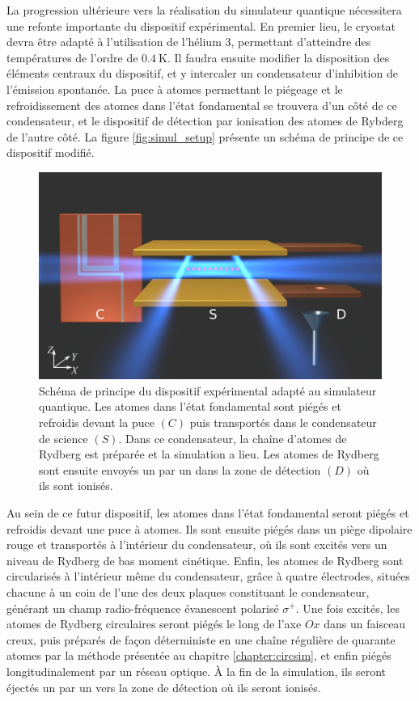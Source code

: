 \bigskip
La progression ultérieure vers la réalisation du simulateur quantique nécessitera une refonte importante du dispositif expérimental.
En premier lieu, le cryostat devra être adapté à l'utilisation de l'hélium $3$, permettant d'atteindre des températures de l'ordre de $\SI{0.4}{\K}$.
Il faudra ensuite modifier la disposition des éléments centraux du dispositif, et y intercaler un condensateur d'inhibition de l'émission spontanée.
La puce à atomes permettant le piégeage et le refroidissement des atomes dans l'état fondamental se trouvera d'un côté de ce condensateur, et le dispositif de détection par ionisation des atomes de Rybderg de l'autre côté.
La figure \eqref{fig:simul_setup} présente un schéma de principe de ce dispositif modifié.
%
\begin{figure}[t]
\centering
\includegraphics[width=0.6\linewidth]{figures/compscheme}
\caption[Schéma de principe du dispositif expérimental adapté au simulateur quantique]{
Schéma de principe du dispositif expérimental adapté au simulateur quantique.
Les atomes dans l'état fondamental sont piégés et refroidis devant la puce $(C)$ puis transportés dans le condensateur de science $(S)$.
Dans ce condensateur, la chaîne d'atomes de Rydberg est préparée et la simulation a lieu.
Les atomes de Rydberg sont ensuite envoyés un par un dans la zone de détection $(D)$ où ils sont ionisés.
}
\label{fig:simul_setup}
\end{figure}
%

Au sein de ce futur dispositif, les atomes dans l'état fondamental seront piégés et refroidis devant une puce à atomes.
Ils sont ensuite piégés dans un piège dipolaire rouge et transportés à l'intérieur du condensateur, où ils sont excités vers un niveau de Rydberg de bas moment cinétique.
Enfin, les atomes de Rydberg sont \og circularisés \fg{} à l'intérieur même du condensateur, grâce à quatre électrodes, situées chacune à un coin de l'une des deux plaques constituant le condensateur, générant un champ radio-fréquence évanescent polarisé $\sigma^+$.
Une fois excités, les atomes de Rydberg circulaires seront piégés le long de l'axe $Ox$ dans un faisceau creux, puis préparés de façon déterministe en une chaîne régulière de quarante atomes par la méthode présentée au chapitre \ref{chapter:circsim}, et enfin piégés longitudinalement par un réseau optique.
\`A la fin de la simulation, ils seront éjectés un par un vers la zone de détection où ils seront ionisés.

